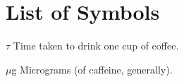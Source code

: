 \chapter{List of Symbols}

\begin{symbollist}[0.7in]
	\item[$\tau$] Time taken to drink one cup of coffee.
	\item[$\mu$g] Micrograms (of caffeine, generally).
\end{symbollist}

